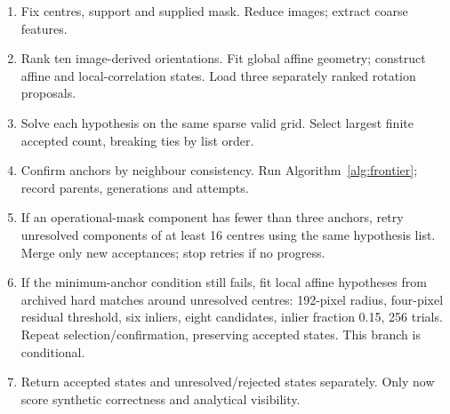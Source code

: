 \begin{table}[p]\small\centering
\caption{Complete confirmatory workflow. Every solve uses native images and unchanged local solver settings.}\label{alg:chain}
\begin{minipage}{.95\linewidth}\begin{enumerate}
\item Fix centres, support and supplied mask. Reduce images; extract coarse features.
\item Rank ten image-derived orientations. Fit global affine geometry; construct affine and local-correlation states. Load three separately ranked rotation proposals.
\item Solve each hypothesis on the same sparse valid grid. Select largest finite accepted count, breaking ties by list order.
\item Confirm anchors by neighbour consistency. Run Algorithm~\ref{alg:frontier}; record parents, generations and attempts.
\item If an operational-mask component has fewer than three anchors, retry unresolved components of at least 16 centres using the same hypothesis list. Merge only new acceptances; stop retries if no progress.
\item If the minimum-anchor condition still fails, fit local affine hypotheses from archived hard matches around unresolved centres: 192-pixel radius, four-pixel residual threshold, six inliers, eight candidates, inlier fraction 0.15, 256 trials. Repeat selection/confirmation, preserving accepted states. This branch is conditional.
\item Return accepted states and unresolved/rejected states separately. Only now score synthetic correctness and analytical visibility.
\end{enumerate}\end{minipage}\end{table}


